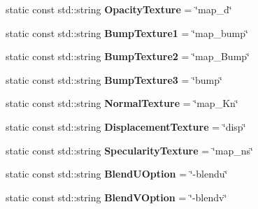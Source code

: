 \begin{DoxyCompactItemize}
\item 
\hypertarget{class_assimp_a3af4e95c0d8ea769438b301ed27e3125}{static const std\+::string {\bfseries Opacity\+Texture} = \char`\"{}map\+\_\+d\char`\"{}}\label{class_assimp_a3af4e95c0d8ea769438b301ed27e3125}

\item 
\hypertarget{class_assimp_a4392622a09affcaaa047114b1d11cf8b}{static const std\+::string {\bfseries Bump\+Texture1} = \char`\"{}map\+\_\+bump\char`\"{}}\label{class_assimp_a4392622a09affcaaa047114b1d11cf8b}

\item 
\hypertarget{class_assimp_aeed3fcf5d1bf4e39e80f4a2ab39ae937}{static const std\+::string {\bfseries Bump\+Texture2} = \char`\"{}map\+\_\+\+Bump\char`\"{}}\label{class_assimp_aeed3fcf5d1bf4e39e80f4a2ab39ae937}

\item 
\hypertarget{class_assimp_adcbe1fbd93fdef1e85cb977b061b518a}{static const std\+::string {\bfseries Bump\+Texture3} = \char`\"{}bump\char`\"{}}\label{class_assimp_adcbe1fbd93fdef1e85cb977b061b518a}

\item 
\hypertarget{class_assimp_a4c09fbb5a862f45932a3732fb68ef171}{static const std\+::string {\bfseries Normal\+Texture} = \char`\"{}map\+\_\+\+Kn\char`\"{}}\label{class_assimp_a4c09fbb5a862f45932a3732fb68ef171}

\item 
\hypertarget{class_assimp_ad20e2caf2c08c338d408a122112d12b0}{static const std\+::string {\bfseries Displacement\+Texture} = \char`\"{}disp\char`\"{}}\label{class_assimp_ad20e2caf2c08c338d408a122112d12b0}

\item 
\hypertarget{class_assimp_a35be880e8244fbeac97ae3080416afd9}{static const std\+::string {\bfseries Specularity\+Texture} = \char`\"{}map\+\_\+ns\char`\"{}}\label{class_assimp_a35be880e8244fbeac97ae3080416afd9}

\item 
\hypertarget{class_assimp_aa0b946261f44f04dec56bdc1e269398f}{static const std\+::string {\bfseries Blend\+U\+Option} = \char`\"{}-\/blendu\char`\"{}}\label{class_assimp_aa0b946261f44f04dec56bdc1e269398f}

\item 
\hypertarget{class_assimp_a52e2a17da50345453d363f50f45420e0}{static const std\+::string {\bfseries Blend\+V\+Option} = \char`\"{}-\/blendv\char`\"{}}\label{class_assimp_a52e2a17da50345453d363f50f45420e0}


\end{DoxyCompactItemize}
